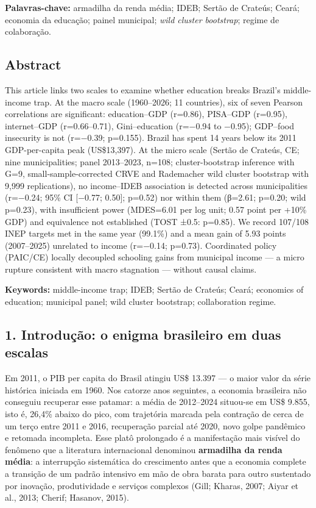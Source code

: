 \documentclass[
  brazilian,
  12pt,
  a4paper,
]{article}
\begin{document}
\textbf{Palavras-chave:} armadilha da renda média; IDEB; Sertão de
Crateús; Ceará; economia da educação; painel municipal; \emph{wild
cluster bootstrap}; regime de colaboração.

\subsection{Abstract}\label{abstract}

This article links two scales to examine whether education breaks
Brazil's middle-income trap. At the macro scale (1960--2026; 11
countries), six of seven Pearson correlations are significant:
education--GDP (r=0.86), PISA--GDP (r=0.95), internet--GDP
(r=0.66--0.71), Gini--education (r=−0.94 to −0.95); GDP--food insecurity
is not (r=−0.39; p=0.155). Brazil has spent 14 years below its 2011
GDP-per-capita peak (US\$13,397). At the micro scale (Sertão de Crateús,
CE; nine municipalities; panel 2013--2023, n=108; cluster-bootstrap
inference with G=9, small-sample-corrected CRVE and Rademacher wild
cluster bootstrap with 9,999 replications), no income--IDEB association
is detected across municipalities (r=−0.24; 95\% CI {[}−0.77; 0.50{]};
p=0.52) nor within them (β=2.61; p=0.20; wild p=0.23), with insufficient
power (MDES=6.01 per log unit; 0.57 point per +10\% GDP) and equivalence
not established (TOST ±0.5: p=0.85). We record 107/108 INEP targets met
in the same year (99.1\%) and a mean gain of 5.93 points (2007--2025)
unrelated to income (r=−0.14; p=0.73). Coordinated policy (PAIC/CE)
locally decoupled schooling gains from municipal income --- a micro
rupture consistent with macro stagnation --- without causal claims.

\textbf{Keywords:} middle-income trap; IDEB; Sertão de Crateús; Ceará;
economics of education; municipal panel; wild cluster bootstrap;
collaboration regime.

\subsection{1. Introdução: o enigma brasileiro em duas
escalas}\label{introduuxe7uxe3o-o-enigma-brasileiro-em-duas-escalas}

Em 2011, o PIB per capita do Brasil atingiu US\$ 13.397 --- o maior
valor da série histórica iniciada em 1960. Nos catorze anos seguintes, a
economia brasileira não conseguiu recuperar esse patamar: a média de
2012--2024 situou-se em US\$ 9.855, isto é, 26,4\% abaixo do pico, com
trajetória marcada pela contração de cerca de um terço entre 2011 e
2016, recuperação parcial até 2020, novo golpe pandêmico e retomada
incompleta. Esse platô prolongado é a manifestação mais visível do
fenômeno que a literatura internacional denominou \textbf{armadilha da
renda média}: a interrupção sistemática do crescimento antes que a
economia complete a transição de um padrão intensivo em mão de obra
barata para outro sustentado por inovação, produtividade e serviços
complexos (Gill; Kharas, 2007; Aiyar et al., 2013; Cherif; Hasanov,
2015).
\end{document}

